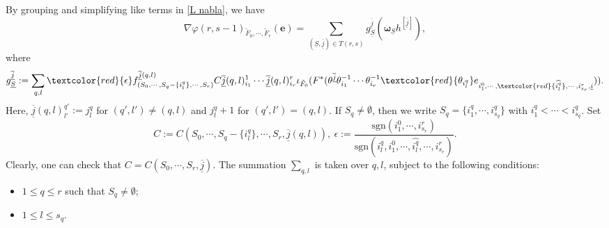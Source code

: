 \documentclass[12pt, a4paper]{article}
\begin{document}
By grouping and simplifying like terms in \eqref{L nabla}, we have
$$\nabla\varphi(r,s-1)_{\tilde F_0,\cdots,\tilde F_r}(\boldsymbol{e})=\sum_{(\underline S,\underline{\overline j})\in T(r,s)}g_{\underline S}^{\underline{\overline j}}(\boldsymbol{\omega}_{\underline S}h^{[\underline{\overline j}]}),$$
where
$$
g_{\underline S}^{\underline{\overline j}}:=\sum_{q,l}\textcolor{red}{\epsilon}f_{(S_0,\cdots,S_q-\{i^q_l\},\cdots,S_r)}^{\underline{\overline j}(q,l)}C\underline{\overline j}(q,l)^1_{i_1}\cdots \underline{\overline j}(q,l)^r_{i_r}\iota_{\tilde F_0}(F^*(\theta^{\underline{\overline j}}\theta_{i_1}^{-1}\cdots\theta_{i_r}^{-1}\textcolor{red}{\theta_{i^q_l}}e_{i^0_1,\cdots,\textcolor{red}{\widehat{i^q_l}},\cdots,i^r_{s_r},\underline i})).
$$
Here, $\underline{\overline j}(q,l)^{q'}_{l'}:=j^q_l$ for $(q',l')\neq(q,l)$ and $j^q_l+1$ for $(q',l')=(q,l)$.
If $S_q\neq\emptyset$, then we write $S_q=\{i_1^q,\cdots,i^q_{s_q}\}$ with $i^q_1<\cdots<i^q_{s_q}$. Set
$$C:=C(S_0,\cdots,S_q-\{i^q_l\},\cdots,S_r,\underline{\overline j}(q,l)),~\epsilon:=\frac{\mathrm{sgn}(i^0_1,\cdots,i^r_{s_r})}{\mathrm{sgn}(i_l^q,i^0_1,\cdots,\widehat{i^q_l},\cdots,i^r_{s_r})}.$$
Clearly, one can check that $C=C(S_0,\cdots,S_r,\underline{\overline j})$. The summation $\sum_{q,l}$ is taken over $q,l$, subject to the following conditions:
\begin{itemize}
    \item $1\leq q\leq r$ such that $S_q\neq\emptyset$;
    \item $1\leq l\leq s_q$.
\end{itemize}
\end{document}
